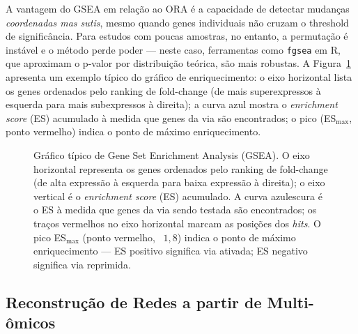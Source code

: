 A vantagem do GSEA em relação ao ORA é a capacidade de detectar mudanças
\emph{coordenadas mas sutis}, mesmo quando genes individuais não cruzam o
threshold de significância. Para estudos com poucas amostras, no entanto, a
permutação é instável e o método perde poder --- neste caso, ferramentas
como \texttt{fgsea} em R, que aproximam o p-valor por distribuição teórica,
são mais robustas. A Figura~\ref{fig:11-gsea} apresenta um exemplo
típico do gráfico de enriquecimento: o eixo horizontal lista os genes
ordenados pelo ranking de fold-change (de mais superexpressos à esquerda
para mais subexpressos à direita); a curva azul mostra o \emph{enrichment
score} (ES) acumulado à medida que genes da via são encontrados; o
pico (ES$_{\max}$, ponto vermelho) indica o ponto de máximo
enriquecimento.

\begin{figure}[htbp]
\centering
{}
\caption{Gráfico típico de Gene Set Enrichment Analysis (GSEA). O eixo horizontal representa os genes ordenados pelo ranking de fold-change (de alta expressão à esquerda para baixa expressão à direita); o eixo vertical é o \emph{enrichment score} (ES) acumulado. A curva azulescura é o ES à medida que genes da via sendo testada são encontrados; os traços vermelhos no eixo horizontal marcam as posições dos \emph{hits}. O pico ES$_{\max}$ (ponto vermelho, ~$1{,}8$) indica o ponto de máximo enriquecimento --- ES positivo significa via ativada; ES negativo significa via reprimida.}
\label{fig:11-gsea}
\end{figure}

\subsection{Reconstrução de Redes a partir de Multi-ômicos}
\label{sub:image11-reconstrucao}

